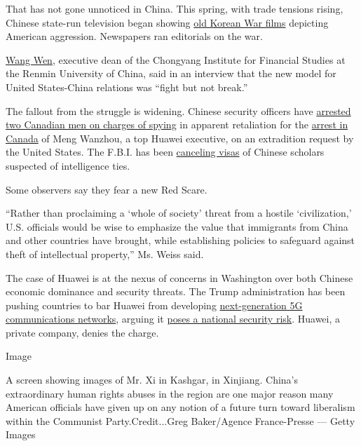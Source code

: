 That has not gone unnoticed in China. This spring, with trade tensions
rising, Chinese state-run television began showing
\href{https://www.economist.com/china/2019/05/23/amid-trade-tensions-with-america-china-is-showing-old-war-films}{old
Korean War films} depicting American aggression. Newspapers ran
editorials on the war.

\href{http://en.rdcy.org/Index/news_cont/id/14791}{Wang Wen}, executive
dean of the Chongyang Institute for Financial Studies at the Renmin
University of China, said in an interview that the new model for United
States-China relations was ``fight but not break.''

The fallout from the struggle is widening. Chinese security officers
have
\href{https://www.nytimes3xbfgragh.onion/2019/05/16/world/asia/china-canadian-arrested.html}{arrested
two Canadian men on charges of spying} in apparent retaliation for the
\href{https://www.nytimes3xbfgragh.onion/2018/12/06/us/politics/huawei-meng-china-iran.html}{arrest
in Canada} of Meng Wanzhou, a top Huawei executive, on an extradition
request by the United States. The F.B.I. has been
\href{https://www.nytimes3xbfgragh.onion/2019/04/14/world/asia/china-academics-fbi-visa-bans.html}{canceling
visas} of Chinese scholars suspected of intelligence ties.

Some observers say they fear a new Red Scare.

``Rather than proclaiming a `whole of society' threat from a hostile
`civilization,' U.S. officials would be wise to emphasize the value that
immigrants from China and other countries have brought, while
establishing policies to safeguard against theft of intellectual
property,'' Ms. Weiss said.

The case of Huawei is at the nexus of concerns in Washington over both
Chinese economic dominance and security threats. The Trump
administration has been pushing countries to bar Huawei from developing
\href{https://www.nytimes3xbfgragh.onion/2018/12/31/technology/personaltech/5g-what-you-need-to-know.html}{next-generation
5G communications networks}, arguing it
\href{https://www.nytimes3xbfgragh.onion/2019/01/26/us/politics/huawei-china-us-5g-technology.html?module=inline}{poses
a national security risk}. Huawei, a private company, denies the charge.

Image

A screen showing images of Mr. Xi in Kashgar, in Xinjiang. China's
extraordinary human rights abuses in the region are one major reason
many American officials have given up on any notion of a future turn
toward liberalism within the Communist Party.Credit...Greg Baker/Agence
France-Presse --- Getty Images

